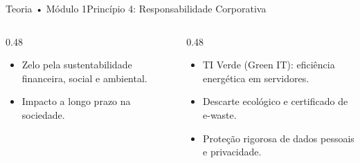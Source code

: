 \begin{senaiframe}{Teoria • Módulo 1}{Princípio 4: Responsabilidade Corporativa}
  \begin{columns}[t]
    \begin{column}{0.48\textwidth}
      \begin{tcolorbox}[senaibluecard, title={Conceito do IBGC}]
        \begin{itemize}
          \item Zelo pela sustentabilidade financeira, social e ambiental.
          \item Impacto a longo prazo na sociedade.
        \end{itemize}
      \end{tcolorbox}
    \end{column}
    \begin{column}{0.48\textwidth}
      \begin{tcolorbox}[senaigreencard, title={Aplicação Prática na TI}]
        \begin{itemize}
          \item TI Verde (Green IT): eficiência energética em servidores.
          \item Descarte ecológico e certificado de e-waste.
          \item Proteção rigorosa de dados pessoais e privacidade.
        \end{itemize}
      \end{tcolorbox}
    \end{column}
  \end{columns}
\end{senaiframe}

